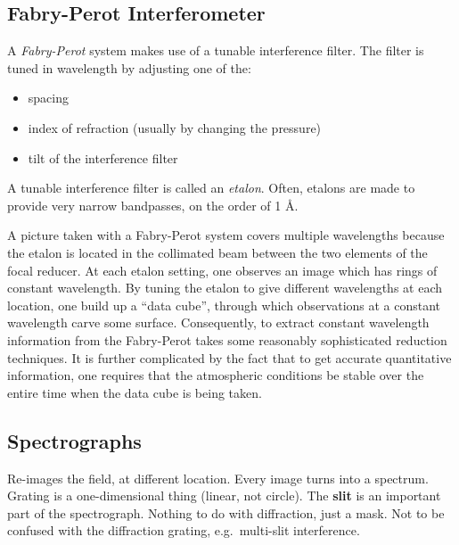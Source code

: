 \documentclass[12pt]{article}
\newcommand{\mynotes}[1]{\textcolor{myBlue}{#1}}
\begin{document}
\subsection{Fabry-Perot Interferometer}
A \emph{Fabry-Perot} system makes use of a tunable interference filter. The
filter is tuned in wavelength by adjusting one of the:
\begin{itemize}
    \item spacing
    \item index of refraction (usually by changing the pressure)
    \item tilt of the interference filter
\end{itemize}
A tunable interference filter is called an \emph{etalon}.
Often, etalons are
made to provide very narrow bandpasses, on the order of 1 \AA{}.
\par A picture taken with a Fabry-Perot system covers multiple wavelengths
because the etalon is located in the collimated beam between the two
elements of the focal reducer. At each etalon setting, one observes an
image which has rings of constant wavelength. By tuning the etalon to
give different wavelengths at each location, one build up a ``data
cube'', through which observations at a constant wavelength carve some
surface. Consequently, to extract constant wavelength information from
the Fabry-Perot takes some reasonably sophisticated reduction
techniques. It is further complicated by the fact that to get accurate
quantitative information, one requires that the atmospheric conditions
be stable over the entire time when the data cube is being taken.

\subsection{Spectrographs}
\mynotes{Re-images the field, at different location. Every image turns into
a spectrum. Grating is a one-dimensional thing (linear, not circle).
The \textbf{slit} is an important part of the spectrograph. Nothing
to do with diffraction, just a mask. Not to be confused with the
diffraction grating, e.g.\ multi-slit interference.}
\end{document}

